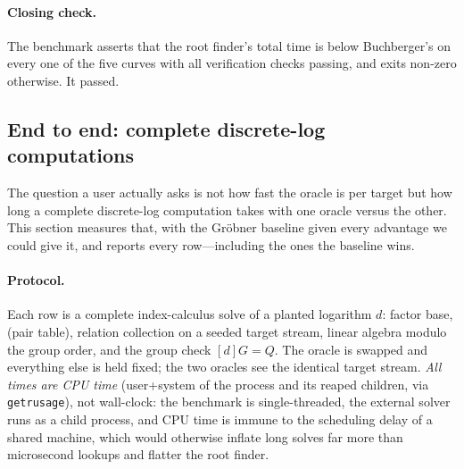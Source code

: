 \documentclass[10pt,a4paper]{article}
\theoremstyle{remark}
\newcommand{\code}[1]{\texttt{#1}}
\begin{document}
\paragraph{Closing check.} The benchmark asserts that the root finder's
total time is below Buchberger's on every one of the five curves with
all verification checks passing, and exits non-zero otherwise. It
passed.

\subsection{End to end: complete discrete-log computations}
\label{sec:exp-e2e}

The question a user actually asks is not how fast the oracle is per
target but how long a complete discrete-log computation takes with one
oracle versus the other. This section measures that, with the
Gr\"obner baseline given every advantage we could give it, and reports
every row---including the ones the baseline wins.

\paragraph{Protocol.} Each row is a complete index-calculus solve of a
planted logarithm $d$: factor base, (pair table), relation collection
on a seeded target stream, linear algebra modulo the group order, and
the group check $[d]G = Q$. The oracle is swapped and everything else
is held fixed; the two oracles see the identical target stream.
\emph{All times are CPU time} (user+system of the process and its
reaped children, via \code{getrusage}), not wall-clock: the benchmark
is single-threaded, the external solver runs as a child process, and
CPU time is immune to the scheduling delay of a shared machine, which
would otherwise inflate long solves far more than microsecond lookups
and flatter the root finder.
\end{document}
